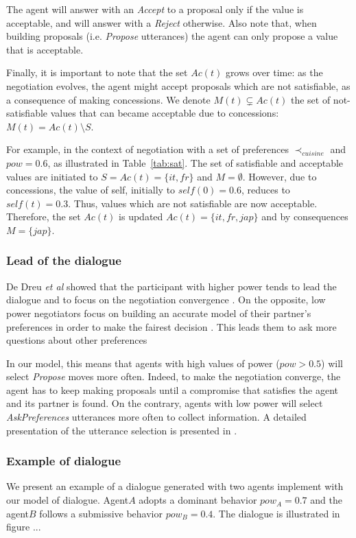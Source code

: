 \documentclass[conference, letterpaper]{IEEEtran}
\begin{document}
	The agent will answer with an \emph{Accept} to a proposal only if the value is acceptable, and will answer with a \emph{Reject} otherwise. Also note that, when building proposals (i.e. \emph{Propose} utterances) the agent can only propose a value that is acceptable.
	
	Finally, it is important to note that the set $Ac(t)$ grows over time: as the negotiation evolves, the agent might accept proposals which are not satisfiable, as a consequence of making concessions. We denote $M(t)\subsetneq Ac(t)$ the set of not-satisfiable values that can became acceptable due to concessions: $M(t)=Ac(t)\setminus S$.

	For example, in the context of negotiation with a set of preferences $\prec_{cuisine}$ and $pow= 0.6$, as illustrated in Table~\ref{tab:sat}. The set of satisfiable and acceptable values are initiated to $S=Ac(t)=\{it,fr\}$ and $M= \emptyset$. 
	However, due to concessions, the value of self, initially to $self(0)=0.6$, reduces to $self(t)=0.3$. Thus, values which are not satisfiable are now acceptable. Therefore, the set $Ac(t)$  is updated  $Ac(t)=\{it,fr,jap\}$ and by consequences $M=\{jap\}$. 
	
	\subsubsection{Lead of the dialogue}
	De Dreu \textit{et al} showed that the participant with higher power tends to lead the dialogue and to focus on the negotiation convergence \cite{magee2007power,de2004influence}. On the opposite, low power negotiators focus on building an accurate model of their partner's preferences in order to make the fairest decision \cite{de1995impact}. This leads them to ask more questions about other preferences
	
	In our model, this means that agents with high values of power ($pow>0.5$) will select \emph{Propose} moves more often. Indeed, to make the negotiation converge, the agent has to keep making proposals until a compromise that satisfies the agent and its partner is found.
	On the contrary, agents with low power will select \emph{AskPreferences} utterances more often to collect information. A detailed presentation of the utterance selection is presented in \cite{ouali2017computational}.
		
	
	\subsubsection{Example of dialogue}	
		We present an example of a dialogue generated with two agents implement with our model of dialogue. Agent$A$ adopts a dominant behavior $pow_A =0.7$ and the agent$B$ follows a submissive behavior $pow_B =0.4$. The dialogue is illustrated in figure ... 
		
\end{document}
